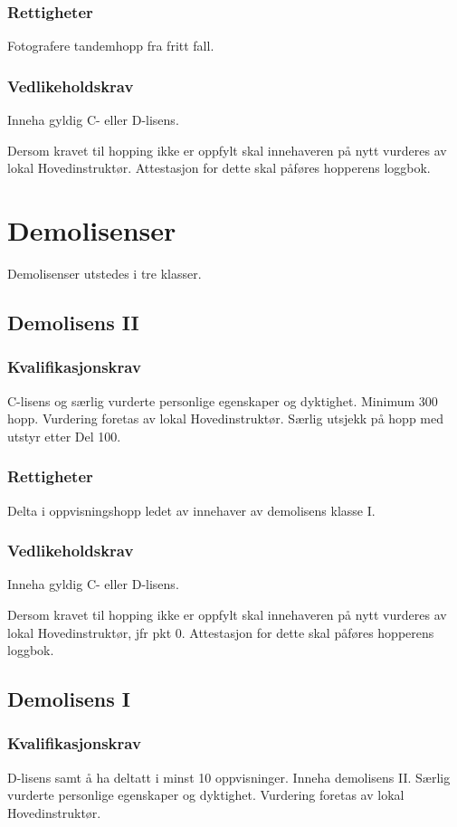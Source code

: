 \subsubsection{Rettigheter}
Fotografere tandemhopp fra fritt fall.

\subsubsection{Vedlikeholdskrav}
Inneha gyldig C- eller D-lisens.

Dersom kravet til hopping ikke er oppfylt skal innehaveren på nytt vurderes av lokal Hovedinstruktør. Attestasjon for dette skal påføres hopperens loggbok.

\section{Demolisenser}
Demolisenser utstedes i tre klasser.

\subsection{Demolisens II}
\subsubsection{Kvalifikasjonskrav}
C-lisens og særlig vurderte personlige egenskaper og dyktighet. Minimum 300 hopp. Vurdering foretas av lokal Hovedinstruktør. Særlig utsjekk på hopp med utstyr etter Del 100.

\subsubsection{Rettigheter}
Delta i oppvisningshopp ledet av innehaver av demolisens klasse I.

\subsubsection{Vedlikeholdskrav}
Inneha gyldig C- eller D-lisens.

Dersom kravet til hopping ikke er oppfylt skal innehaveren på nytt vurderes av lokal Hovedinstruktør, jfr pkt 0. Attestasjon for dette skal påføres hopperens loggbok.

\subsection{Demolisens I}
\subsubsection{Kvalifikasjonskrav}
D-lisens samt å ha deltatt i minst 10 oppvisninger. Inneha demolisens II. Særlig vurderte personlige egenskaper og dyktighet. Vurdering foretas av lokal Hovedinstruktør.

